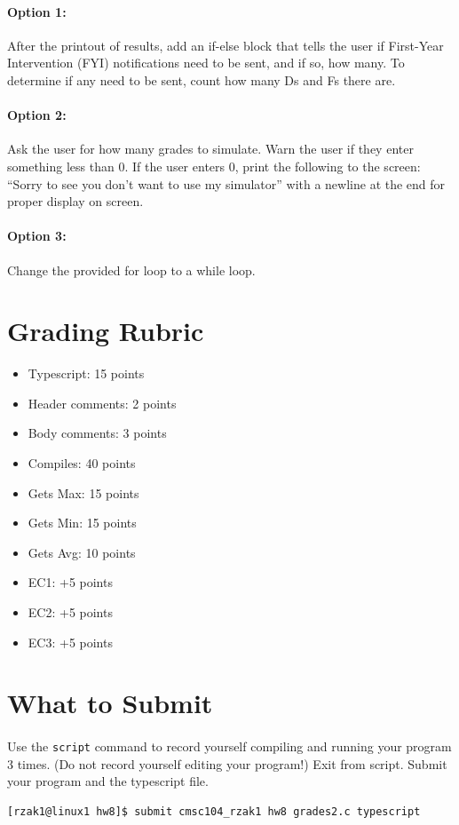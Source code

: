 \documentclass[letter,11pt]{article}
\begin{document}
\paragraph{Option 1:} After the printout of results, add an if-else block that tells the user if First-Year Intervention (FYI) notifications need to be sent, and if so, how many. To determine if any need to be sent, count how many Ds and Fs there are.
\paragraph{Option 2:} Ask the user for how many grades to simulate. Warn the user if they enter something less than 0. If the user enters 0, print the following to the screen: ``Sorry to see you don’t want to use my simulator'' with a newline at the end for proper display on screen.
\paragraph{Option 3:} Change the provided for loop to a while loop. 

\section*{Grading Rubric}
\begin{itemize}
    \item Typescript: 15 points
    \item Header comments: 2 points
    \item Body comments: 3 points
    \item Compiles: 40 points
    \item Gets Max: 15 points
    \item Gets Min: 15 points
    \item Gets Avg: 10 points
    \item EC1: +5 points
    \item EC2: +5 points
    \item EC3: +5 points
\end{itemize}

\section*{What to Submit}
\paragraph{}Use the \texttt{script} command to record yourself compiling and running your program 3 times. (Do not record yourself editing your program!) Exit from script. Submit your program and the typescript file.
\begin{verbatim}
[rzak1@linux1 hw8]$ submit cmsc104_rzak1 hw8 grades2.c typescript
\end{verbatim}
\end{document}
